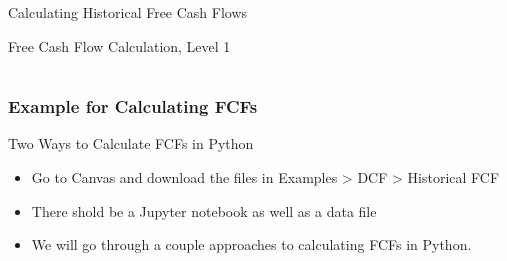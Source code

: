 \documentclass[handout, 11pt]{beamer}
\begin{document}
\begin{section}{Calculating Historical Free Cash Flows}
\begin{frame}
{\begin{block}{Free Cash Flow Calculation, Level 1}
\begin{tabular*}{\textwidth}{@{\extracolsep{\fill}}cccc}
\end{tabular*}
\end{block}
}
\label{labs:calculate-fcf-lab-1}
\end{frame}
\begin{frame}
\frametitle{Example for Calculating FCFs}
{
\begin{block}{Two Ways to Calculate FCFs in Python}
\begin{itemize}
\item Go to Canvas and download the files in Examples > DCF > Historical FCF
\item There shold be a Jupyter notebook as well as a data file
\item We will go through a couple approaches to calculating FCFs in Python.
\end{itemize}
\end{block}
}
\end{frame}
\end{section}
\end{document}
